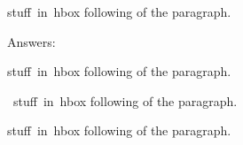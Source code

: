 \indent \hbox{stuff in hbox} following of the paragraph.

Answers:

\indent \hbox{stuff in hbox} following of the paragraph.

\ \unskip\hbox{stuff in hbox} following of the paragraph.

\leavevmode\hbox{stuff in hbox} following of the paragraph.

\bye


